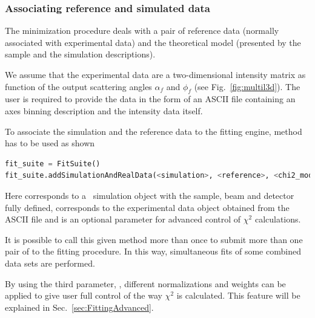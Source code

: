 \subsubsection{Associating reference and simulated data}

The minimization procedure deals with a pair of reference data (normally
associated with experimental data) and the theoretical model (presented by the sample and the simulation descriptions).

We assume that the experimental data are a two-dimensional intensity
matrix as function of the output scattering
angles $\alpha_f$ and $\phi_f$ (see Fig.~\ref{fig:multil3d}).
The user is required to provide the data in the form of an ASCII file
containing an axes
binning description and the intensity data itself.
\vspace*{2mm}

\vspace*{1mm}

To associate the simulation and the reference data to the fitting engine, method \newline
{} has to be used as shown
\begin{lstlisting}[language=python, style=eclipseboxed,numbers=none]
fit_suite = FitSuite()
fit_suite.addSimulationAndRealData(<simulation>, <reference>, <chi2_module>)
\end{lstlisting}

Here  corresponds to a \BornAgain\ simulation object
with the  sample, beam and detector fully defined, 
corresponds to the experimental data object obtained from the ASCII file and  is an optional parameter for advanced
control of $\chi^2$ calculations.

It is possible to call this given method more than once to submit more than one pair of
 to the fitting procedure.
In this way, simultaneous fits of
some combined data sets are performed.

By using the third parameter, , different normalizations and weights
can be applied to give user full control of the way $\chi^2$ is calculated.
This feature will be explained in Sec.~\ref{sec:FittingAdvanced}.


